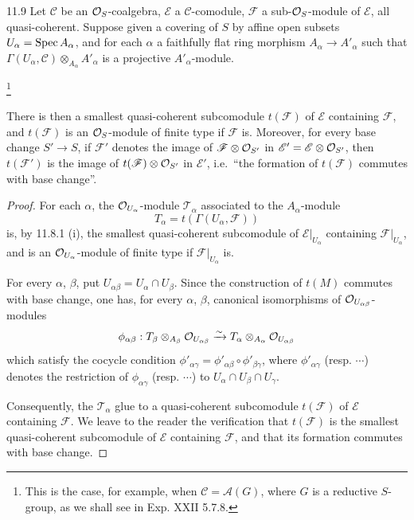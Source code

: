 \begin{proposition}{11.9}\label{VIB.11.9}
Let $\mathscr C$ be an $\mathcal{O}_S$-coalgebra, $\mathscr E$ a $\mathscr C$-comodule, $\mathscr F$ a sub-$\mathcal{O}_S$-module of $\mathscr E$, all quasi-coherent. Suppose given a covering of $S$ by affine open subsets $U_\alpha=\operatorname{Spec} A_\alpha$, and for each $\alpha$ a faithfully flat ring morphism $A_\alpha\to A'_\alpha$ such that $\Gamma(U_\alpha,\mathscr C)\otimes_{A_\alpha}A'_\alpha$ is a projective $A'_\alpha$-module.\begingroup\renewcommand{\thefootnote}{*}\addtocounter{footnote}{-1}\footnote{This is the case, for example, when $\mathscr C=\mathscr A(G)$, where $G$ is a reductive $S$-group, as we shall see in Exp. XXII 5.7.8.}\endgroup

There is then a smallest quasi-coherent subcomodule $t(\mathscr F)$ of $\mathscr E$ containing $\mathscr F$, and $t(\mathscr F)$ is an $\mathcal{O}_S$-module of finite type if $\mathscr F$ is. Moreover, for every base change $S'\to S$, if $\mathscr F'$ denotes the image of $\mathscr F\otimes\mathcal{O}_{S'}$ in $\mathscr E'=\mathscr E\otimes\mathcal{O}_{S'}$, then $t(\mathscr F')$ is the image of $t(\mathscr F)\otimes\mathcal{O}_{S'}$ in $\mathscr E'$, i.e.\ ``the formation of $t(\mathscr F)$ commutes with base change''.
\end{proposition}
\begin{proof}\footnotemark[117]
For each $\alpha$, the $\mathcal{O}_{U_\alpha}$-module $\mathscr T_\alpha$ associated to the $A_\alpha$-module
\[
T_\alpha=t(\Gamma(U_\alpha,\mathscr F))
\]
is, by 11.8.1 (i), the smallest quasi-coherent subcomodule of $\mathscr E|_{U_\alpha}$ containing $\mathscr F|_{U_\alpha}$, and is an $\mathcal{O}_{U_\alpha}$-module of finite type if $\mathscr F|_{U_\alpha}$ is.

For every $\alpha$, $\beta$, put $U_{\alpha\beta}=U_\alpha\cap U_\beta$. Since the construction of $t(M)$ commutes with base change, one has, for every $\alpha$, $\beta$, canonical isomorphisms of $\mathcal{O}_{U_{\alpha\beta}}$-modules
\[
\phi_{\alpha\beta}:T_\beta\otimes_{A_\beta}\mathcal{O}_{U_{\alpha\beta}}\xrightarrow{\sim} T_\alpha\otimes_{A_\alpha}\mathcal{O}_{U_{\alpha\beta}}
\]
which satisfy the cocycle condition $\phi'_{\alpha\gamma}=\phi'_{\alpha\beta}\circ\phi'_{\beta\gamma}$, where $\phi'_{\alpha\gamma}$ (resp. $\cdots$) denotes the restriction of $\phi_{\alpha\gamma}$ (resp. $\cdots$) to $U_\alpha\cap U_\beta\cap U_\gamma$.

Consequently, the $\mathscr T_\alpha$ glue to a quasi-coherent subcomodule $t(\mathscr F)$ of $\mathscr E$ containing $\mathscr F$. We leave to the reader the verification that $t(\mathscr F)$ is the smallest quasi-coherent subcomodule of $\mathscr E$ containing $\mathscr F$, and that its formation commutes with base change.
\end{proof}

